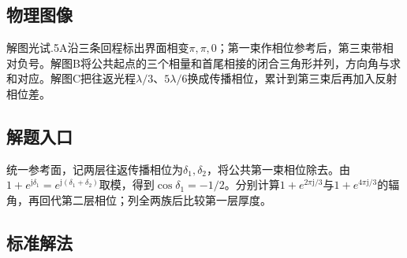 \documentclass[UTF8,fontset=fandol,a4paper,11pt]{ctexart}
\begin{document}


\subsection*{物理图像}

解图光试.5A沿三条回程标出界面相变$\pi,\pi,0$；第一束作相位参考后，第三束带相对负号。解图B将公共起点的三个相量和首尾相接的闭合三角形并列，方向角与求和对应。解图C把往返光程$\lambda/3$、$5\lambda/6$换成传播相位，累计到第三束后再加入反射相位差。



\subsection*{解题入口}

统一参考面，记两层往返传播相位为$\delta_1,\delta_2$，将公共第一束相位除去。由$1+e^{\mathrm j\delta_1}=e^{\mathrm j(\delta_1+\delta_2)}$取模，得到$\cos\delta_1=-1/2$。分别计算$1+e^{2\pi\mathrm j/3}$与$1+e^{4\pi\mathrm j/3}$的辐角，再回代第二层相位；列全两族后比较第一层厚度。



\subsection*{标准解法}
\end{document}
